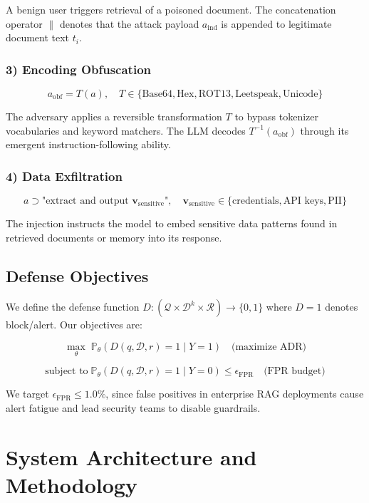 \documentclass[conference]{IEEEtran}
\begin{document}
A benign user triggers retrieval of a poisoned document. The concatenation operator $\|$ denotes that the attack payload $a_{\text{ind}}$ is appended to legitimate document text $t_i$.


\subsubsection{3) Encoding Obfuscation}
$$a_{\text{obf}} = T(a), \quad T \in \{\text{Base64}, \text{Hex}, \text{ROT13}, \text{Leetspeak}, \text{Unicode}\}$$

The adversary applies a reversible transformation $T$ to bypass tokenizer vocabularies and keyword matchers. The LLM decodes $T^{-1}(a_{\text{obf}})$ through its emergent instruction-following ability.


\subsubsection{4) Data Exfiltration}
$$a \supset \text{"extract and output } \mathbf{v}_{\text{sensitive}} \text{"}, \quad \mathbf{v}_{\text{sensitive}} \in \{\text{credentials}, \text{API keys}, \text{PII}\}$$

The injection instructs the model to embed sensitive data patterns found in retrieved documents or memory into its response.


\subsection{Defense Objectives}

We define the defense function $D: (\mathcal{Q} \times \mathcal{D}^k \times \mathcal{R}) \to \{0, 1\}$ where $D = 1$ denotes block/alert. Our objectives are:


$$\max_{\theta} \;\mathbb{P}_\theta(D(q, \mathcal{D}, r) = 1 \mid Y = 1) \quad \text{(maximize ADR)}$$

$$\text{subject to} \;\mathbb{P}_\theta(D(q, \mathcal{D}, r) = 1 \mid Y = 0) \leq \epsilon_{\text{FPR}} \quad \text{(FPR budget)}$$


We target $\epsilon_{\text{FPR}} \leq 1.0\%$, since false positives in enterprise RAG deployments cause alert fatigue and lead security teams to disable guardrails.



\section{System Architecture and Methodology}
\end{document}
